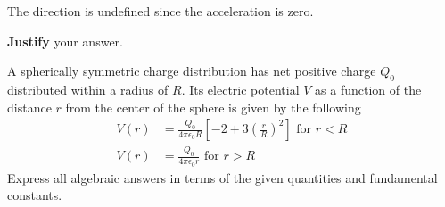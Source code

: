\documentclass{../../../oss-apphys-exam}
\begin{document}
\begin{questions}
\begin{parts}
    \vspace{.1in}\underline{\hspace{.3in}} The direction is undefined since the
    acceleration is zero.

    \vspace{.1in}\textbf{Justify} your answer.
    \vspace{\stretch3}
    
  \end{parts}
  \newpage
  
  \question A spherically symmetric charge distribution has net positive charge
  $Q_0$ distributed within a radius of $R$. Its electric potential $V$ as a
  function of the distance $r$ from the center of the sphere is given by the
  following
  \begin{align*}
    V(r) &= \frac{Q_0}{4\pi\epsilon_0R}\left[-2+3\left(\frac rR\right)^2 \right]
    \text{ for } r<R\\
    V(r) &= \frac{Q_0}{4\pi\epsilon_0r}\text{ for } r>R
  \end{align*}
  Express all algebraic answers in terms of the given quantities and
  fundamental constants.
\end{questions}
\end{document}

